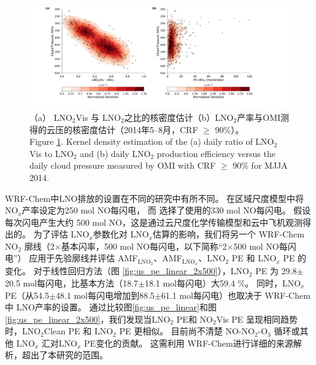 \begin{figure}[htbp]
\centering
\includegraphics[width=15cm]{./figures/us_cp_ratio_lno2.pdf}
\caption{（a） LNO$_\textrm{2}$Vis 与 LNO$_\textrm{2}$之比的核密度估计（b）LNO$_\textrm{2}$产率与OMI测得的云压的核密度估计（2014年5--8月，CRF $\geq$ 90\%）。\\
Figure \ref{fig:us_cp_ratio_lno2}. Kernel density estimation of the (a) daily ratio of LNO$_\textrm{2}$Vis to LNO$_\textrm{2}$ and (b) daily LNO$_\textrm{2}$ production efficiency versus the daily cloud pressure measured by OMI with CRF $\geq$ 90\% for MJJA 2014.}
\label{fig:us_cp_ratio_lno2}
\end{figure}


WRF-Chem中LNO排放的设置在不同的研究中有所不同。
\citet{Zhao.2009}在区域尺度模型中将NO$_x$产率设定为250 mol NO每闪电，
而 \citet{Bela.2016}选择了\citet{Barth.2012}使用的330 mol NO每闪电。
\citet{Wang.2015a}假设每次闪电产生大约 500 mol NO，这是通过云尺度化学传输模型和云中飞机观测得出的\citep{Ott.2010}。
为了评估 LNO$_x$参数化对 LNO$_x$估算的影响，我们将另一个 WRF-Chem NO$_2$ 廓线（2$\times$基本闪率，500 mol NO每闪电，以下简称“2$\times$500 mol NO每闪电”）
应用于先验廓线并评估 AMF$_\textrm{LNO$_2$}$、AMF$_\textrm{LNO$_x$}$、LNO$_2$ PE 和 LNO$_x$ PE 的变化。
对于线性回归方法（图 \ref{fig:us_pe_linear_2x500}），LNO$_2$ PE 为 29.8$\pm$20.5 mol每闪电，比基本方法（18.7$\pm$18.1 mol每闪电）大59.4 \%。
同时，LNO$_x$ PE（从54.5$\pm$48.1 mol每闪电增加到88.5$\pm$61.1 mol每闪电）也取决于 WRF-Chem 中 LNO产率的设置。
通过比较图\ref{fig:us_pe_linear}和图\ref{fig:us_pe_linear_2x500}，我们发现当LNO$_2$ PE和 NO$_2$Vis PE 呈现相同趋势时，LNO$_2$Clean PE 和 LNO$_2$ PE 更相似。
目前尚不清楚 NO-NO$_2$-O$_3$ 循环或其他 LNO$_x$ 汇对LNO$_x$ PE变化的贡献。
这需利用 WRF-Chem进行详细的来源解析，超出了本研究的范围。

